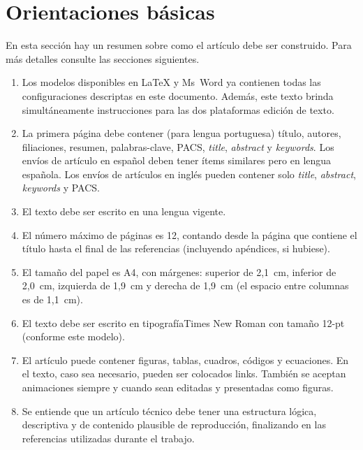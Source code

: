 \documentclass[12pt, a4paper, twoside, twocolumn]{article}
\begin{document}
\section{Orientaciones básicas}


En esta sección hay un resumen sobre como el artículo debe ser construido. Para más detalles consulte las secciones siguientes.

\vspace{-8pt}
\begin{enumerate} \itemsep=2pt
    \item Los modelos disponibles en LaTeX y Ms~Word ya contienen todas las configuraciones descriptas en este documento. Además, este texto brinda simultáneamente instrucciones para las dos plataformas edición de texto.
	\item La primera página debe contener (para lengua portuguesa) título, autores, filiaciones, resumen, palabras-clave, PACS, \textit{title}, \textit{abstract} y \textit{keywords}. Los envíos de artículo en español deben tener ítems similares pero en lengua española. Los envíos de artículos en inglés pueden contener solo \textit{title}, \textit{abstract}, \textit{keywords} y PACS.
	\item El texto debe ser escrito en una lengua vigente.
	\item El número máximo de páginas es 12, contando desde la página que contiene el título hasta el final de las referencias (incluyendo apéndices, si hubiese).
	\item El tamaño del papel es A4, con márgenes: superior de 2,1~cm, inferior de 2,0~cm, izquierda de 1,9~cm y derecha de 1,9~cm (el espacio entre columnas es de 1,1~cm).
	\item El texto debe ser escrito en tipografía\linebreak Times New Roman con tamaño 12-pt (conforme este modelo).
	\item El artículo puede contener figuras, tablas, cuadros, códigos y ecuaciones. En el texto, caso sea necesario, pueden ser colocados links. También se aceptan animaciones siempre y cuando sean editadas y presentadas como figuras.
	\item Se entiende que un artículo técnico debe tener una estructura lógica, descriptiva y de contenido plausible de reproducción, finalizando en las referencias utilizadas durante el trabajo.
\end{enumerate}
\end{document}
